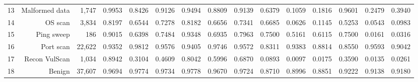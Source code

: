 \begin{table}[htbp]
{\begin{tabular}{lrrrrrrrrrrrrrr}
13 & Malformed data & 1{,}747 & 0.9953 & 0.8426 & 0.9126 & 0.9494 & 0.8809 & 0.9139 & 0.6379 & 0.1059 & 0.1816 & 0.9601 & 0.2479 & 0.3940 \\
14 & OS scan & 3{,}834 & 0.8197 & 0.6544 & 0.7278 & 0.8182 & 0.6656 & 0.7341 & 0.6685 & 0.0626 & 0.1145 & 0.5253 & 0.0543 & 0.0983 \\
15 & Ping sweep & 186 & 0.9015 & 0.6398 & 0.7484 & 0.9348 & 0.6935 & 0.7963 & 0.7500 & 0.5161 & 0.6115 & 0.7500 & 0.0161 & 0.0316 \\
16 & Port scan & 22{,}622 & 0.9352 & 0.9812 & 0.9576 & 0.9405 & 0.9746 & 0.9572 & 0.8311 & 0.9383 & 0.8814 & 0.8550 & 0.9593 & 0.9042 \\
17 & Recon VulScan & 1{,}034 & 0.8942 & 0.3104 & 0.4609 & 0.8042 & 0.5996 & 0.6870 & 0.0893 & 0.0097 & 0.0175 & 0.3590 & 0.0135 & 0.0261 \\
18 & Benign & 37{,}607 & 0.9694 & 0.9774 & 0.9734 & 0.9778 & 0.9670 & 0.9724 & 0.8710 & 0.8996 & 0.8851 & 0.9222 & 0.9138 & 0.9180 \\
\bottomrule
\end{tabular}}
\end{table}
